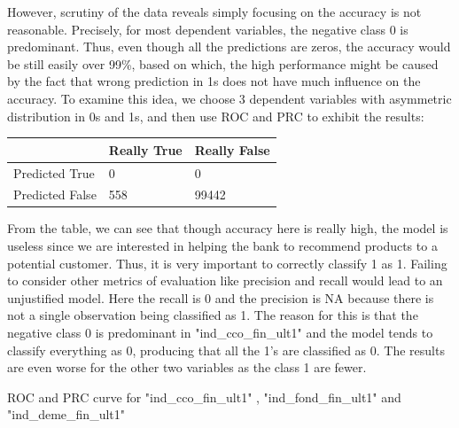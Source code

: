 \documentclass{article}
\begin{document}
\begin{spacing}{1}
\begin{large}
However, scrutiny of the data reveals simply focusing on the accuracy is not reasonable. Precisely, for most dependent variables, the negative class 0 is predominant. Thus, even though all the predictions are zeros, the accuracy would be still easily over 99\%, based on which, the high performance might be caused by the fact that wrong prediction in 1s does not have much influence on the accuracy. To examine this idea, we choose 3 dependent variables with asymmetric distribution in 0s and 1s, and then use ROC and PRC to exhibit the results:

\vspace{5mm}
\begin{tabular}{| l | l | l |}
	\hline
	& Really True & Really False \\ \hline
	Predicted True & 0 & 0 \\ \hline
	Predicted False & 558 & 99442\\
	\hline
\end{tabular}
\vspace{5mm}

From the table, we can see that though accuracy here is really high, the model is  useless since we are  interested in helping the bank to recommend products to a potential customer. Thus, it is very important to correctly classify 1 as 1. Failing to consider other metrics of evaluation like precision and recall would lead to an unjustified model. Here the recall is 0 and the precision is NA because there is not a single observation being classified as 1. The reason for this is that the negative class 0 is predominant in "ind\_cco\_fin\_ult1" and the model tends to classify everything as 0, producing that all the 1’s are classified as 0. The results are even worse for the other two variables as the class 1 are fewer.

ROC and PRC curve for "ind\_cco\_fin\_ult1" , "ind\_fond\_fin\_ult1" and "ind\_deme\_fin\_ult1"


\end{large}
\end{spacing}
\end{document}
